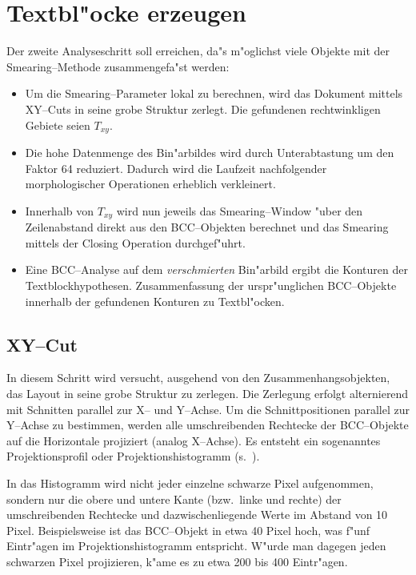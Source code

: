 
\section{Textbl"ocke erzeugen}
Der zweite Analyseschritt soll erreichen, da"s m"oglichst viele Objekte mit der
Smearing--Methode zusammengefa"st werden:
\begin{itemize}
  \item Um die Smearing--Parameter lokal zu berechnen, wird das Dokument mittels XY--Cuts in
        seine grobe Struktur zerlegt. Die gefundenen rechtwinkligen Gebiete seien $T_{xy}$.

  \item Die hohe Datenmenge des Bin"arbildes wird durch Unterabtastung um den Faktor 64
        reduziert. Dadurch wird die Laufzeit nachfolgender morphologischer Operationen
        erheblich verkleinert.

  \item Innerhalb von $T_{xy}$ wird nun jeweils das Smearing--Window "uber den
        Zeilenabstand direkt aus den BCC--Objekten berechnet und das Smearing mittels
        der Closing Operation durchgef"uhrt.

  \item Eine BCC--Analyse auf dem {\em verschmierten\/} Bin"arbild ergibt die
        Konturen der Textblockhypothesen. Zusammenfassung der urspr"unglichen BCC--Objekte innerhalb der
        gefundenen Konturen zu Textbl"ocken.
\end{itemize}
\subsection{XY--Cut}\label{XYCut}

In diesem Schritt wird versucht, ausgehend von den Zusammenhangsobjekten, das Layout in
seine grobe Struktur zu zerlegen. Die Zerlegung erfolgt alternierend mit Schnitten parallel
zur X-- und Y--Achse. Um die Schnittpositionen parallel zur Y--Achse zu bestimmen, werden alle umschreibenden Rechtecke der BCC--Objekte auf die Horizontale projiziert (analog X--Achse).
Es entsteht ein sogenanntes Projektionsprofil oder Projektionshistogramm
(s.\ ).


In das Histogramm wird nicht jeder einzelne schwarze Pixel aufgenommen, sondern nur die
obere und untere Kante (bzw.\ linke und rechte) der umschreibenden Rechtecke und
da\-zwischen\-liegende Werte im Abstand von 10 Pixel.
Beispielsweise ist das BCC--Objekt in  etwa 40 Pixel hoch,
was f"unf Eintr"agen im Projektionshistogramm entspricht. W"urde man dagegen jeden
schwarzen Pixel projizieren, k"ame es zu etwa 200 bis 400 Eintr"agen.

